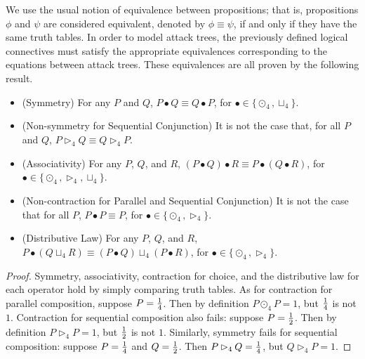 We use the usual notion of equivalence between propositions; that is,
propositions $\phi$ and $\psi$ are considered equivalent, denoted by
$\phi \equiv \psi$, if and only if they have the same truth tables. In
order to model attack trees, the previously defined logical
connectives must satisfy the appropriate equivalences corresponding to
the equations between attack trees.  These equivalences are all proven
by the following result.
\begin{lemma}
  \label{lemma:props_atree_ops_quaternary-semantics}
  \begin{itemize}
  \item[] (Symmetry) For any $P$ and $Q$, $P \bullet Q \equiv Q \bullet P$, for $\bullet \in \{\odot_4, \sqcup_4\}$.\\[-5px]
  \item[] (Non-symmetry for Sequential Conjunction) It is not the case that, for all $P$ and $Q$, $P \rhd_4 Q \equiv Q \rhd_4 P$.\\[-5px]
  \item[] (Associativity) For any $P$, $Q$, and $R$, $(P \bullet Q) \bullet R \equiv P \bullet (Q \bullet R)$, for $\bullet \in \{\odot_4, \rhd_4, \sqcup_4\}$.\\[-5px]
  \item[] (Non-contraction for Parallel and Sequential Conjunction) It is not the case that for all $P$, $P \bullet P \equiv P$, for $\bullet \in \{\odot_4, \rhd_4\}$.\\[-5px]
  \item[] (Distributive Law) For any $P$, $Q$, and $R$, $P \bullet (Q \sqcup_4 R) \equiv (P \bullet Q) \sqcup_4 (P \bullet R)$, for $\bullet \in \{\odot_4, \rhd_4\}$.\\[-5px]
  \end{itemize}
\end{lemma}
\begin{proof}
  Symmetry, associativity, contraction for choice, and the
  distributive law for each operator hold by simply comparing truth
  tables.  As for contraction for parallel composition, suppose $P =
  \frac{1}{4}$.  Then by definition $P \odot_4 P = 1$, but $\frac{1}{4}$ is not
  $1$.  Contraction for sequential composition also fails: suppose $P
  = \frac{1}{2}$.  Then by definition $P \rhd_4 P = 1$, but $\frac{1}{2}$ is not
  $1$.  Similarly, symmetry fails for sequential composition: suppose
  $P = \frac{1}{4}$ and $Q = \frac{1}{2}$.  Then $P \rhd_4 Q = \frac{1}{4}$, but $Q
  \rhd_4 P = 1$.
\end{proof}

